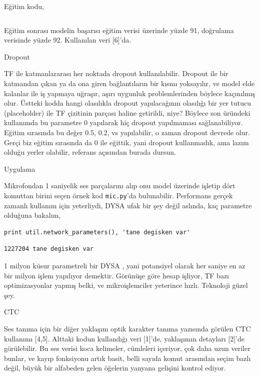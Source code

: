 \documentclass[12pt,fleqn]{article}\usepackage{../../common}
\begin{document}
Eğitim kodu,

\inputminted[fontsize=\footnotesize]{python}{train_rnn.py}

Eğitim sonrası modelin başarısı eğitim verisi üzerinde yüzde 91, doğrulama
verisinde yüzde 92. Kullanılan veri [6]'da.

Dropout

TF ile katmanlararası her noktada dropout kullanılabilir. Dropout ile bir
katmandan çıkan ya da ona giren bağlantıların bir kısmı yoksayılır, ve
model elde kalanlar ile iş yapmaya uğraşır, aşırı uygunluk problemlerinden
böylece kaçınılmış olur. Üstteki kodda hangi olasılıkla dropout
yapılacağının olasılığı bir yer tutucu (placeholder) ile TF çizitinin
parçası haline getirildi, niye? Böylece son üründeki kullanımda bu
parametre 0 yapılarak hiç dropout yapılmaması sağlanabiliyor. Eğitim
sırasında bu değer 0.5, 0.2, vs yapılabilir, o zaman dropout devrede
olur. Gerçi biz eğitim sırasında da 0 ile eğittik, yani dropout
kullanmadık, ama lazım olduğu yerler olabilir, referans açısından burada
dursun.

Uygulama

Mikrofondan 1 saniyelik ses parçalarını alıp onu model üzerinde işletip
dört komuttan birini seçen örnek kod \verb!mic.py!'da
bulunabilir. Performans gerçek zamanlı kullanım için yeterliydi, DYSA ufak
bir şey değil aslında, kaç parametre olduğuna bakalım,

\begin{verbatim}
print util.network_parameters(), 'tane degisken var'
\end{verbatim}

\begin{verbatim}
1227204 tane degisken var
\end{verbatim}

1 milyon küsur parametreli bir DYSA , yani potansiyel olarak her saniye en
az bir milyon işlem yapılıyor demektir. Görünüşe göre hesap işliyor, TF
bazı optimizasyonlar yapmış belki, ve mikroişlemciler yeterince
hızlı. Teknoloji güzel şey.

CTC

Ses tanıma için bir diğer yaklaşım optik karakter tanıma yazısında görülen
CTC kullanımı [4,5]. Alttaki kodun kullandığı veri [1]'de, yaklaşımın
detayları [2]'de görülebilir. Bu ses verisi koca kelimeler, cümleleri
içeriyor, çok daha uzun veriler bunlar, ve kayıp fonksiyonu artık basit,
belli sayıda komut arasından seçim bazlı değil, büyük bir alfabeden gelen
öğelerin yanyana gelişini kontrol ediyor.
\end{document}
